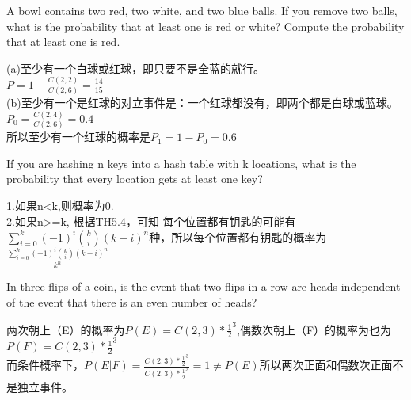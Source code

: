 \documentclass[a4paper, justified]{tufte-handout}
\begin{document}
\begin{problem}[CS 5.2-4]
A bowl contains two red, two white, and two blue balls. If you remove two balls, what is the probability that at least one is red or white? Compute the probability that at least one is red.
\end{problem}

\begin{solution}
  (a)至少有一个白球或红球，即只要不是全蓝的就行。\\
  $P = 1 - \frac{C(2, 2)}{C(2, 6)} = \frac{14}{15}$\\
  (b)至少有一个是红球的对立事件是：一个红球都没有，即两个都是白球或蓝球。\\
  $P_0 = \frac{C(2,4)}{C(2, 6)} = 0.4$\\
  所以至少有一个红球的概率是$P_1=1-P_0 = 0.6$\\
\end{solution}

\begin{problem}[CS 5.2-10]
If you are hashing n keys into a hash table with k locations, what is the probability that every location gets at least one key?
\end{problem}

\begin{solution}
  1.如果n<k,则概率为0.\\
  2.如果n>=k, 根据TH5.4，可知%
  每个位置都有钥匙的可能有$\sum^k_{i = 0}(-1)^i\binom{k}{i} (k-i)^n$种，所以每个位置都有钥匙的概率为$\frac{\sum^k_{i = 0}(-1)^i\binom{k}{i} (k-i)^n}{k^n}$

\end{solution}

\begin{problem}[CS 5.3-2]
In three flips of a coin, is the event that two flips in a row are heads independent of the event that there is an even number of heads?

\end{problem}

\begin{solution}
  两次朝上（E）的概率为$P(E) = C(2,3) * \frac{1}{2}^3$,偶数次朝上（F）的概率为也为$P(F) = C(2,3) * \frac{1}{2}^3$\\
  而条件概率下，$P(E|F) = \frac{C(2,3) * \frac{1}{2}^3}{C(2,3) * \frac{1}{2}^3} = 1 \neq P(E)$所以两次正面和偶数次正面不是独立事件。
\end{solution}
\end{document}
